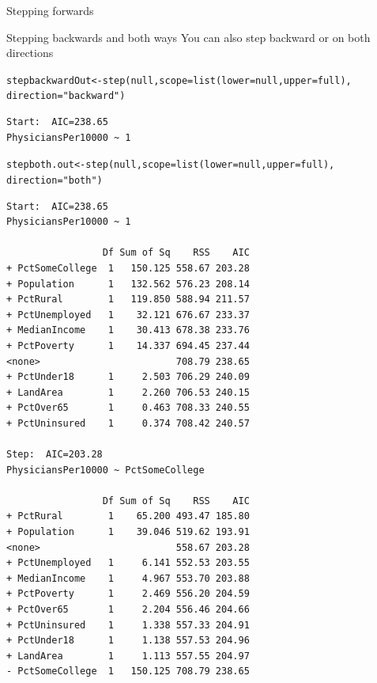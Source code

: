 \documentclass{beamer}\usepackage[]{graphicx}\usepackage[]{color}
\makeatletter
\newcommand{\hlstr}[1]{\textcolor[rgb]{1,0.894,0.71}{#1}}%
\newcommand{\hlstd}[1]{\textcolor[rgb]{1,0.894,0.769}{#1}}%
\newcommand{\hlkwb}[1]{\textcolor[rgb]{0.804,0.776,0.451}{#1}}%
\newcommand{\hlkwc}[1]{\textcolor[rgb]{0.78,0.941,0.545}{#1}}%
\newcommand{\hlkwd}[1]{\textcolor[rgb]{1,0.78,0.769}{#1}}%
\newenvironment{kframe}{%
 \def\at@end@of@kframe{}%
 \ifinner\ifhmode%
  \def\at@end@of@kframe{\end{minipage}}%
  \begin{minipage}{\columnwidth}%
 \fi\fi%
 \def\FrameCommand##1{\hskip\@totalleftmargin \hskip-\fboxsep
 \colorbox{shadecolor}{##1}\hskip-\fboxsep
     \hskip-\linewidth \hskip-\@totalleftmargin \hskip\columnwidth}%
 \MakeFramed {\advance\hsize-\width
   \@totalleftmargin\z@ \linewidth\hsize
   \@setminipage}}%
 {\par\unskip\endMakeFramed%
 \at@end@of@kframe}
\newenvironment{knitrout}{}{} %
\makeatother
\begin{document}
\begin{darkframes}
\begin{frame}[fragile]{Stepping forwards}
      \lc 
    \end{frame}

  
    \begin{frame}[fragile]{Stepping backwards and both ways}
    \fontsize{8}{8}\selectfont
    You can also step backward or on both directions

\begin{knitrout}
\begin{kframe}
\begin{alltt}
\hlstd{stepbackwardOut}\hlkwb{<-} \hlkwd{step}\hlstd{(null,} \hlkwc{scope}\hlstd{=}\hlkwd{list}\hlstd{(}\hlkwc{lower}\hlstd{=null,} \hlkwc{upper}\hlstd{=full),}
                  \hlkwc{direction} \hlstd{=}\hlstr{"backward"}\hlstd{)}
\end{alltt}
\begin{verbatim}
Start:  AIC=238.65
PhysiciansPer10000 ~ 1
\end{verbatim}
\begin{alltt}
\hlstd{stepboth.out} \hlkwb{<-}   \hlkwd{step}\hlstd{(null,} \hlkwc{scope}\hlstd{=}\hlkwd{list}\hlstd{(}\hlkwc{lower}\hlstd{=null,} \hlkwc{upper}\hlstd{=full),}
                  \hlkwc{direction} \hlstd{=}\hlstr{"both"}\hlstd{)}
\end{alltt}
\begin{verbatim}
Start:  AIC=238.65
PhysiciansPer10000 ~ 1

                 Df Sum of Sq    RSS    AIC
+ PctSomeCollege  1   150.125 558.67 203.28
+ Population      1   132.562 576.23 208.14
+ PctRural        1   119.850 588.94 211.57
+ PctUnemployed   1    32.121 676.67 233.37
+ MedianIncome    1    30.413 678.38 233.76
+ PctPoverty      1    14.337 694.45 237.44
<none>                        708.79 238.65
+ PctUnder18      1     2.503 706.29 240.09
+ LandArea        1     2.260 706.53 240.15
+ PctOver65       1     0.463 708.33 240.55
+ PctUninsured    1     0.374 708.42 240.57

Step:  AIC=203.28
PhysiciansPer10000 ~ PctSomeCollege

                 Df Sum of Sq    RSS    AIC
+ PctRural        1    65.200 493.47 185.80
+ Population      1    39.046 519.62 193.91
<none>                        558.67 203.28
+ PctUnemployed   1     6.141 552.53 203.55
+ MedianIncome    1     4.967 553.70 203.88
+ PctPoverty      1     2.469 556.20 204.59
+ PctOver65       1     2.204 556.46 204.66
+ PctUninsured    1     1.338 557.33 204.91
+ PctUnder18      1     1.138 557.53 204.96
+ LandArea        1     1.113 557.55 204.97
- PctSomeCollege  1   150.125 708.79 238.65


\end{verbatim}
\end{kframe}
\end{knitrout}
\end{frame}
\end{darkframes}
\end{document}
